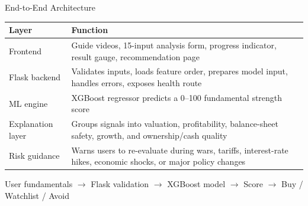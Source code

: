\documentclass[aspectratio=169]{beamer}
\begin{document}
\begin{frame}{End-to-End Architecture}
\small
\begin{center}
\begin{tabular}{p{3.1cm} p{7.7cm}}
\toprule
\textbf{Layer} & \textbf{Function} \\
\midrule
Frontend & Guide videos, 15-input analysis form, progress indicator, result gauge, recommendation page \\
\addlinespace
Flask backend & Validates inputs, loads feature order, prepares model input, handles errors, exposes health route \\
\addlinespace
ML engine & XGBoost regressor predicts a 0--100 fundamental strength score \\
\addlinespace
Explanation layer & Groups signals into valuation, profitability, balance-sheet safety, growth, and ownership/cash quality \\
\addlinespace
Risk guidance & Warns users to re-evaluate during wars, tariffs, interest-rate hikes, economic shocks, or major policy changes \\
\bottomrule
\end{tabular}
\end{center}

\vspace{0.25cm}
\centering
User fundamentals $\rightarrow$ Flask validation $\rightarrow$ XGBoost model $\rightarrow$ Score $\rightarrow$ Buy / Watchlist / Avoid
\end{frame}
\end{document}
